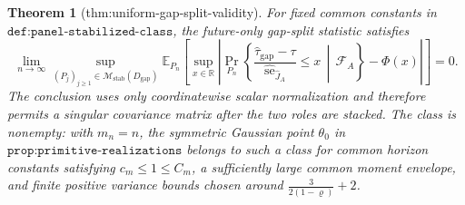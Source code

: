 \documentclass{article}
\newtheorem{theorem}{Theorem}
\begin{document}
\begin{theorem}[thm:uniform-gap-split-validity]\label{thm:uniform-gap-split-validity}
For fixed common constants in \(\texttt{def:panel-stabilized-class}\), the future-only gap-split statistic satisfies
\[
 \lim_{n\to\infty}
 \sup_{(P_j)_{j\geq1}\in\mathcal M_{\mathrm{stab}}(D_{\mathrm{gap}})}
 \mathbb E_{P_n}\!\left[
  \sup_{x\in\mathbb R}
  \left|
   \Pr_{P_n}\!\left\{
    \frac{\widehat\tau_{\mathrm{gap}}-\tau}
         {\widehat{\operatorname{se}}_{\widehat J_A}}
    \leq x\,\middle|\,\mathcal F_A
   \right\}-\Phi(x)
  \right|
 \right]=0.
\]
The conclusion uses only coordinatewise scalar normalization and therefore permits a singular covariance matrix after the two roles are stacked.  The class is nonempty: with \(m_n=n\), the symmetric Gaussian point \(\theta_0\) in \(\texttt{prop:primitive-realizations}\) belongs to such a class for common horizon constants satisfying \(c_m\leq1\leq C_m\), a sufficiently large common moment envelope, and finite positive variance bounds chosen around \(\frac{3}{2(1-\varrho)}+2\).
\end{theorem}
\end{document}
